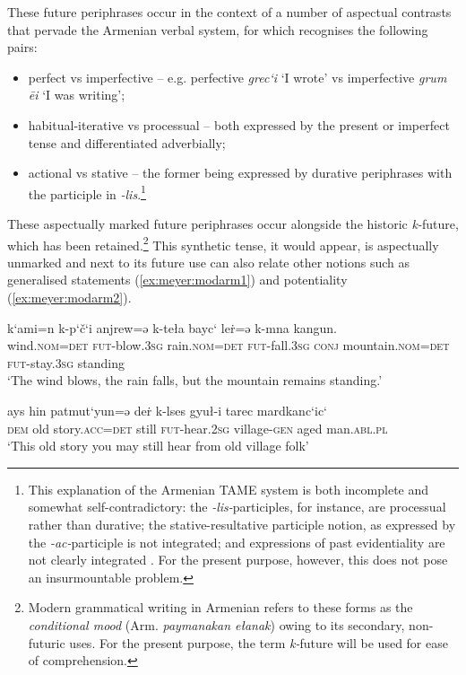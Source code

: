 \documentclass[output=paper,colorlinks,citecolor=brown]{langscibook}
\begin{document}
These future periphrases occur in the context of a number of aspectual contrasts that pervade the Armenian verbal system, for which \citet[193–199]{DumTragut2009} recognises the following pairs:
\begin{itemize}
	\item perfect vs imperfective – e.g. perfective \textit{grec‘i} ‘I wrote’ vs imperfective \textit{grum ēi} ‘I was writing’;
	\item habitual-iterative vs processual – both expressed by the present or imperfect tense and differentiated adverbially;
	\item actional vs stative – the former being expressed by durative periphrases with the participle in \textit{-lis}.\footnote{This explanation of the Armenian TAME system is both incomplete and somewhat self-contradictory: the \textit{-lis-}participles, for instance, are processual rather than durative; the stative-resultative participle notion, as expressed by the \textit{-ac-}participle is not integrated; and expressions of past evidentiality are not clearly integrated \citep{Kozintseva2000}. For the present purpose, however, this does not pose an insurmountable problem.}
\end{itemize}
These aspectually marked future periphrases occur alongside the historic \textit{k-}future, which has been retained.\footnote{Modern grammatical writing in Armenian refers to these forms as the \textit{conditional mood} (Arm. \textit{paymanakan ełanak}) owing to its secondary, non-futuric uses. For the present purpose, the term \textit{k-}future will be used for ease of comprehension.} This synthetic tense, it would appear, is aspectually unmarked and next to its future use can also relate other notions such as generalised statements (\ref{ex:meyer:modarm1}) and potentiality (\ref{ex:meyer:modarm2}).

\ea \label{ex:meyer:modarm1}
\gll k‘ami=n k-p‘č‘i anjrew=ə k-teła bayc‘ leṙ=ə k-mna kangun.\\
wind.\textsc{nom=det} \textsc{fut-}blow.\textsc{3sg} rain.\textsc{nom=det} \textsc{fut-}fall.\textsc{3sg} \textsc{conj} mountain.\textsc{nom=det} \textsc{fut-}stay.\textsc{3sg} standing\\
\glt ‘The wind blows, the rain falls, but the mountain remains standing.’ \citep[254–255]{DumTragut2009}
\z {}

\ea \label{ex:meyer:modarm2}
\gll ays hin patmut‘yun=ə deṙ k-lses gyuł-i tarec mardkanc‘ic‘\\
\textsc{dem} old story.\textsc{acc=det} still \textsc{fut-}hear.\textsc{2sg} village-\textsc{gen} aged man.\textsc{abl.pl}\\
\glt ‘This old story you may still hear from old village folk’ \citep[255]{DumTragut2009}
\z {}
\end{document}
